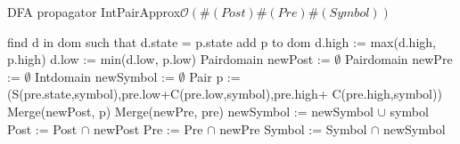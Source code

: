 \begin{algorithm}[H]
\caption{DFA propagator IntPairApprox\newline $\mathcal{O}(\#(Post)\#(Pre)\#(Symbol))$}
\begin{algorithmic}[1]
	\State find d in dom such that d.state = p.state
		\State add p to dom
	\Else	
		\State d.high := max(d.high, p.high)
		\State d.low := min(d.low, p.low)
	\EndIf
\EndProcedure
{}
\State Pairdomain newPost := $\emptyset$
\State Pairdomain newPre := $\emptyset$
\State Intdomain newSymbol := $\emptyset$
		\State Pair p :=(S(pre.state,symbol),pre.low+C(pre.low,symbol),pre.high+ C(pre.high,symbol))
			\State Merge(newPost, p)
			\State Merge(newPre, pre)
			\State newSymbol := newSymbol $\cup$ symbol 
		\EndIf
	\EndFor
\EndFor
\State Post := Post $\cap$ newPost
\State Pre := Pre $\cap$ newPre
\State Symbol := Symbol $\cap$ newSymbol
\EndProcedure
\end{algorithmic}
\end{algorithm}


